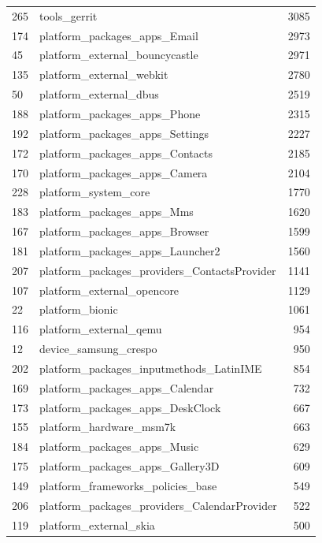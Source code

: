 \documentclass[a4paper,10pt]{article}
\numberwithin{equation}{subsection}
\begin{document}
\begin{table}
\begin{tabularx}{\textwidth}{ | X | l | r |}
265 & tools\_gerrit & 3085\\ 
174 & platform\_packages\_apps\_Email & 2973\\ 
45 & platform\_external\_bouncycastle & 2971\\ 
135 & platform\_external\_webkit & 2780\\ 
50 & platform\_external\_dbus & 2519\\ 
188 & platform\_packages\_apps\_Phone & 2315\\ 
192 & platform\_packages\_apps\_Settings & 2227\\ 
172 & platform\_packages\_apps\_Contacts & 2185\\ 
170 & platform\_packages\_apps\_Camera & 2104\\ 
228 & platform\_system\_core & 1770\\ 
183 & platform\_packages\_apps\_Mms & 1620\\ 
167 & platform\_packages\_apps\_Browser & 1599\\ 
181 & platform\_packages\_apps\_Launcher2 & 1560\\ 
207 & platform\_packages\_providers\_ContactsProvider & 1141\\ 
107 & platform\_external\_opencore & 1129\\ 
22 & platform\_bionic & 1061\\ 
116 & platform\_external\_qemu & 954\\ 
12 & device\_samsung\_crespo & 950\\ 
202 & platform\_packages\_inputmethods\_LatinIME & 854\\ 
169 & platform\_packages\_apps\_Calendar & 732\\ 
173 & platform\_packages\_apps\_DeskClock & 667\\ 
155 & platform\_hardware\_msm7k & 663\\ 
184 & platform\_packages\_apps\_Music & 629\\ 
175 & platform\_packages\_apps\_Gallery3D & 609\\ 
149 & platform\_frameworks\_policies\_base & 549\\ 
206 & platform\_packages\_providers\_CalendarProvider & 522\\ 
119 & platform\_external\_skia & 500\\
  \hline  
  \end{tabularx}
\end{table}
\end{document}
